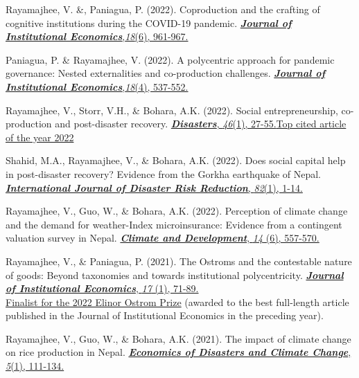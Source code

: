 \documentclass[12pt,letterpaper]{report}
\begin{document}
\begin{etaremune} [leftmargin=15 pt, start=30, itemsep=3pt]
\item  Rayamajhee, V. \&, Paniagua, P. (2022). Coproduction and the crafting of cognitive institutions during the COVID-19 pandemic.
\href{https://doi.org/10.1017/S1744137422000078}
{\textit{\textbf{Journal of Institutional Economics}},\textit{18}(6), 961-967.
}

\item Paniagua, P. \& Rayamajhee, V. (2022).  A polycentric approach for pandemic governance: Nested externalities and co-production challenges.
\href{https://doi.org/10.1017/S1744137421000795}
{\textit{\textbf{Journal of Institutional Economics}},\textit{18}(4), 537-552.
}

\item Rayamajhee, V., Storr, V.H., \& Bohara, A.K.  (2022). Social entrepreneurship, co-production and post-disaster recovery.
\href{https://doi.org/10.1111/disa.12454}
{\textit{\textbf{Disasters}}, \textit{46}(1), 27-55.}\underline{Top cited article of the year 2022}

\item Shahid, M.A., Rayamajhee, V., \& Bohara, A.K. (2022). Does social capital help in post-disaster recovery? Evidence from the Gorkha earthquake of Nepal. \href{https://doi.org/10.1016/j.ijdrr.2022.103359}
{\textit{\textbf{International Journal of Disaster Risk Reduction}}, \textit{82}(1), 1-14.
}

\item Rayamajhee, V., Guo, W., \& Bohara, A.K. (2022). Perception of climate change and the demand for weather-Index microinsurance: Evidence from a contingent valuation survey in Nepal.
\href{https://doi.org/10.1080/17565529.2021.1949574}
{\textit{\textbf{Climate and Development}}, \textit{14} (6), 557-570.
}

\item Rayamajhee, V., \& Paniagua, P. (2021).  The Ostroms and the contestable nature of goods: Beyond taxonomies and towards institutional polycentricity.  \href{https://doi.org/10.1017/S1744137420000338}
{\textit{\textbf{Journal of Institutional Economics}}, \textit{17} (1), 71-89.} \\
 \tab \underline{Finalist for the 2022 Elinor Ostrom Prize} (awarded to the best full-length article \\\tab published in the  Journal of Institutional Economics in the preceding year).

\item  Rayamajhee, V., Guo, W., \& Bohara, A.K. (2021). The impact of climate change on rice production in Nepal.
\href{https://doi.org/10.1007/s41885-020-00079-8}
{\textit{\textbf{Economics of Disasters and Climate Change}}, \textit{5}(1), 111-134.
}


\end{etaremune}
\end{document}
